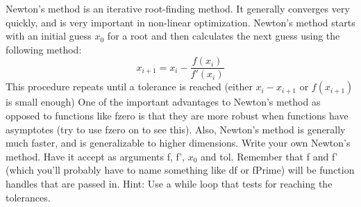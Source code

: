 \begin{problem}
Newton's method is an iterative root-finding method. It generally converges very quickly, and is very important in non-linear optimization. Newton's method starts with an initial guess $x_0$ for a root and then calculates the next guess using the following method:
\[
x_{i+1} = x_i - \frac{f(x_i)}{f'(x_i)}
\]
This procedure repeats until a tolerance is reached (either $x_i - x_{i+1}$ or $f(x_{i+1})$ is small enough)
One of the important advantages to Newton's method as opposed to functions like fzero is that they are more robust when functions have asymptotes (try to use fzero on  to see this). Also, Newton's method is generally much faster, and is generalizable to higher dimensions.
Write your own Newton's method. Have it accept as arguments f, f', $x_0$ and tol. Remember that f and f' (which you'll probably have to name something like df or fPrime) will be function handles that are passed in. Hint: Use a while loop that tests for reaching the tolerances.
\end{problem}
